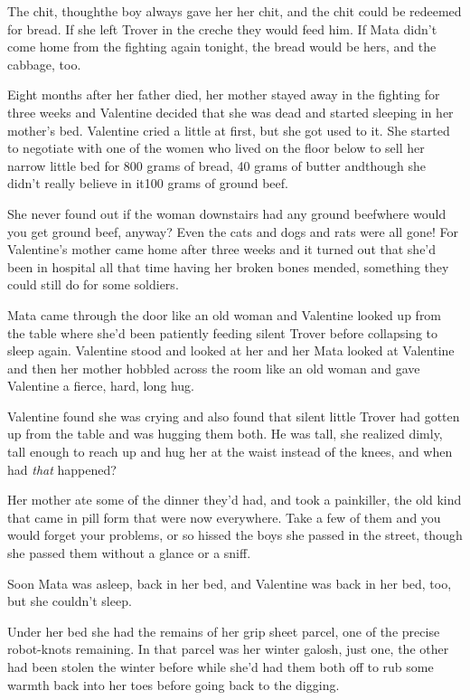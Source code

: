 The chit, though\dash{}the boy always gave her her chit, and the chit
could be redeemed for bread. If she left Trover in the creche they
would feed him. If Mata didn’t come home from the fighting again
tonight, the bread would be hers, and the cabbage, too.

\tb

Eight months after her father died, her mother stayed away in the
fighting for three weeks and Valentine decided that she was dead
and started sleeping in her mother’s bed. Valentine cried a little
at first, but she got used to it. She started to negotiate with one
of the women who lived on the floor below to sell her narrow little
bed for 800 grams of bread, 40 grams of butter and\dash{}though she
didn’t really believe in it\dash{}100 grams of ground beef.

She never found out if the woman downstairs had any ground
beef\dash{}where would you get ground beef, anyway? Even the cats and
dogs and rats were all gone! For Va\-len\-tine’s mother came home after
three weeks and it turned out that she’d been in hospital all that
time having her broken bones mended, something they could still do
for some soldiers.

Mata came through the door like an old woman and Valentine looked
up from the table where she’d been patiently feeding silent Trover
before collapsing to sleep again. Valentine stood and looked at her
and her Mata looked at Valentine and then her mother hobbled across
the room like an old woman and gave Valentine a fierce, hard, long
hug.

Valentine found she was crying and also found that silent little
Trover had gotten up from the table and was hugging them both. He
was tall, she realized dimly, tall enough to reach up and hug her
at the waist instead of the knees, and when had \emph{that}
happened?

Her mother ate some of the dinner they’d had, and took a
painkiller, the old kind that came in pill form that were now
everywhere. Take a few of them and you would forget your problems,
or so hissed the boys she passed in the street, though she passed
them without a glance or a sniff.

Soon Mata was asleep, back in her bed, and Valentine was back in
her bed, too, but she couldn’t sleep.

Under her bed she had the remains of her grip sheet parcel, one of
the precise robot-knots remaining. In that parcel was her winter
galosh, just one, the other had been stolen the winter before while
she’d had them both off to rub some warmth back into her toes
before going back to the digging.

